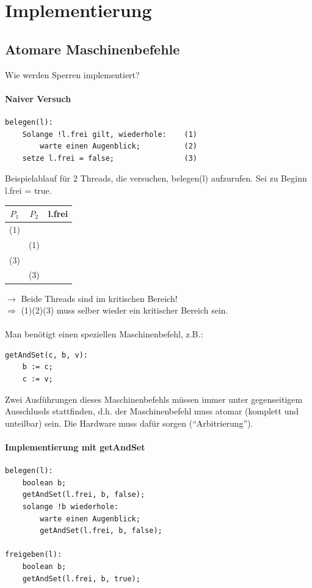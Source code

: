 \chapter{Implementierung}

\section{Atomare Maschinenbefehle}
Wie werden Sperren implementiert?

\subsubsection*{Naiver Versuch}
\begin{lstlisting}
belegen(l):
	Solange !l.frei gilt, wiederhole:    (1)
		warte einen Augenblick;          (2)
	setze l.frei = false;                (3)
\end{lstlisting}
Beispielablauf für 2 Threads, die versuchen, belegen(l) aufzurufen. Sei zu Beginn l.frei = true.
\begin{center}
\begin{tabular}{c c|c}
$P_1$ & $P_2$ & l.frei \\ \hline
(1) & \ & \ \\ 
\ & (1) & \ \\ 
(3) & \ & \ \\
\ & (3) & \ 
\end{tabular}
\end{center}
$\rightarrow$ Beide Threads sind im kritischen Bereich!\\
$\Rightarrow$ (1)(2)(3) muss selber wieder ein kritischer Bereich sein.\\
\\
Man benötigt einen speziellen Maschinenbefehl, z.B.:
\begin{lstlisting}
getAndSet(c, b, v):
	b := c;
	c := v;
\end{lstlisting}
Zwei Ausführungen dieses Maschinenbefehls müssen immer unter gegenseitigem Ausschlusds stattfinden, d.h. der Maschinenbefehl muss atomar (komplett und unteilbar) sein. Die Hardware muss dafür sorgen ("`Arbitrierung"').

\subsubsection*{Implementierung mit getAndSet}
\begin{lstlisting}
belegen(l):
	boolean b;
	getAndSet(l.frei, b, false);
	solange !b wiederhole:
		warte einen Augenblick;
		getAndSet(l.frei, b, false);

freigeben(l):
	boolean b;
	getAndSet(l.frei, b, true);
\end{lstlisting}

